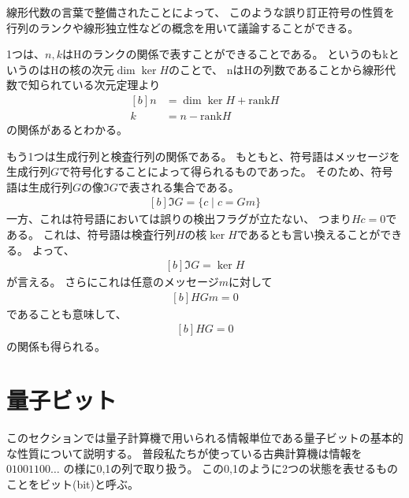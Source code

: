 \documentclass[../master.tex]{subfiles}
\begin{document}
\bigskip
線形代数の言葉で整備されたことによって、
このような誤り訂正符号の性質を行列のランクや線形独立性などの概念を用いて議論することができる。

1つは、\(n,k\)はHのランクの関係で表すことができることである。
というのもkというのはHの核の次元\(\dim\ker H\)のことで、
nはHの列数であることから線形代数で知られている次元定理より
\begin{equation}\begin{aligned}[b]
    n &= \dim\ker H + \text{rank}H \\
    k &= n - \text{rank}H
\end{aligned}\end{equation}
の関係があるとわかる。

もう1つは生成行列と検査行列の関係である。
もともと、符号語はメッセージを生成行列\(G\)で符号化することによって得られるものであった。
そのため、符号語は生成行列\(G\)の像\(\Im G\)で表される集合である。
\begin{equation}\begin{aligned}[b]
    \Im G = \{c \mid c=Gm\}
\end{aligned}\end{equation}
一方、これは符号語においては誤りの検出フラグが立たない、
つまり\(Hc=0\)である。
これは、符号語は検査行列\(H\)の核\(\ker H\)であるとも言い換えることができる。
よって、
\begin{equation}\begin{aligned}[b]
    \Im G = \ker H
\end{aligned}\end{equation}
が言える。
さらにこれは任意のメッセージ\(m\)に対して
\begin{equation}\begin{aligned}[b]
    HGm = 0
\end{aligned}\end{equation}
であることも意味して、
\begin{equation}\begin{aligned}[b]
    HG = 0
\end{aligned}\end{equation}
の関係も得られる。


\section{量子ビット}
このセクションでは量子計算機で用いられる情報単位である量子ビットの基本的な性質について説明する。
普段私たちが使っている古典計算機は情報を \(01001100\ldots\) の様に0,1の列で取り扱う。
この0,1のように2つの状態を表せるものことをビット(bit)と呼ぶ。
\end{document}
